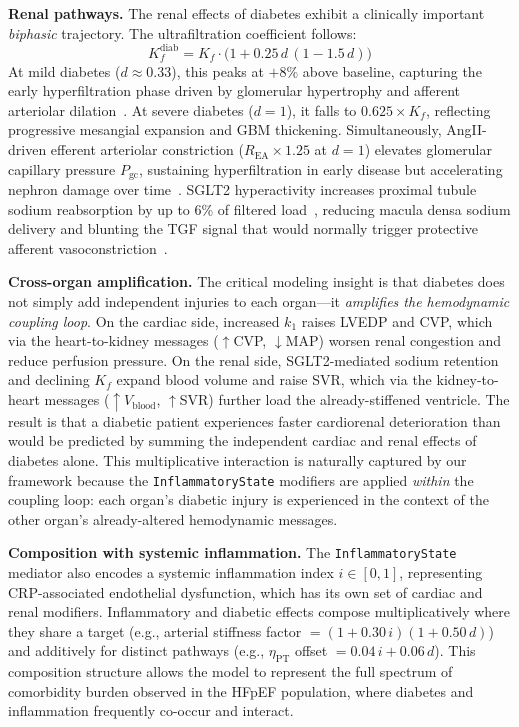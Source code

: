\documentclass[pmlr]{jmlr}
\begin{document}
\textbf{Renal pathways.} The renal effects of diabetes exhibit a clinically important \emph{biphasic} trajectory. The ultrafiltration coefficient follows:
\begin{equation}
K_f^{\text{diab}} = K_f \cdot \bigl(1 + 0.25\,d\,(1 - 1.5\,d)\bigr)
\label{eq:kf_diab}
\end{equation}
At mild diabetes ($d \approx 0.33$), this peaks at $+8\%$ above baseline, capturing the early hyperfiltration phase driven by glomerular hypertrophy and afferent arteriolar dilation~\citep{brenner1996}. At severe diabetes ($d = 1$), it falls to $0.625 \times K_f$, reflecting progressive mesangial expansion and GBM thickening. Simultaneously, AngII-driven efferent arteriolar constriction ($R_{\text{EA}} \times 1.25$ at $d=1$) elevates glomerular capillary pressure $P_{\text{gc}}$, sustaining hyperfiltration in early disease but accelerating nephron damage over time~\citep{brenner1996}. SGLT2 hyperactivity increases proximal tubule sodium reabsorption by up to 6\% of filtered load~\citep{thomson2004}, reducing macula densa sodium delivery and blunting the TGF signal that would normally trigger protective afferent vasoconstriction~\citep{vallon2003}.

\textbf{Cross-organ amplification.} The critical modeling insight is that diabetes does not simply add independent injuries to each organ---it \emph{amplifies the hemodynamic coupling loop}. On the cardiac side, increased $k_1$ raises LVEDP and CVP, which via the heart-to-kidney messages ($\uparrow$CVP, $\downarrow$MAP) worsen renal congestion and reduce perfusion pressure. On the renal side, SGLT2-mediated sodium retention and declining $K_f$ expand blood volume and raise SVR, which via the kidney-to-heart messages ($\uparrow V_{\text{blood}}$, $\uparrow$SVR) further load the already-stiffened ventricle. The result is that a diabetic patient experiences faster cardiorenal deterioration than would be predicted by summing the independent cardiac and renal effects of diabetes alone. This multiplicative interaction is naturally captured by our framework because the \texttt{InflammatoryState} modifiers are applied \emph{within} the coupling loop: each organ's diabetic injury is experienced in the context of the other organ's already-altered hemodynamic messages.

\textbf{Composition with systemic inflammation.} The \texttt{InflammatoryState} mediator also encodes a systemic inflammation index $i \in [0,1]$, representing CRP-associated endothelial dysfunction, which has its own set of cardiac and renal modifiers. Inflammatory and diabetic effects compose multiplicatively where they share a target (e.g., arterial stiffness factor $= (1 + 0.30\,i)(1 + 0.50\,d)$) and additively for distinct pathways (e.g., $\eta_{\text{PT}}$ offset $= 0.04\,i + 0.06\,d$). This composition structure allows the model to represent the full spectrum of comorbidity burden observed in the HFpEF population, where diabetes and inflammation frequently co-occur and interact.
\end{document}
